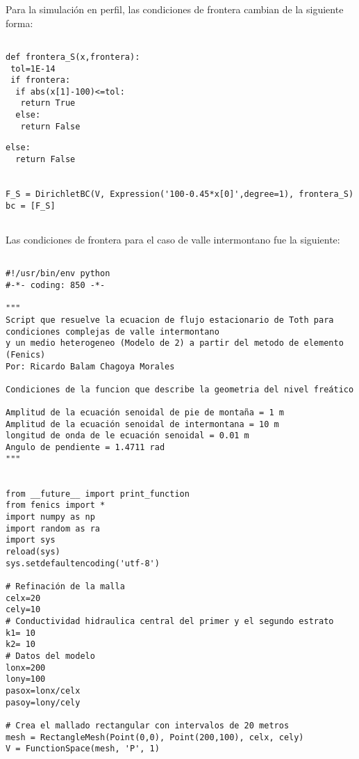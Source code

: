 Para la simulación en perfil, las condiciones de frontera cambian de la siguiente forma:

\lstset{language=python,breaklines=true, basicstyle=\footnotesize}
\begin{lstlisting}[frame=single]

def frontera_S(x,frontera):
 tol=1E-14    
 if frontera:
  if abs(x[1]-100)<=tol: 
   return True
  else:
   return False

\end{lstlisting}   
\begin{lstlisting}[frame=single]   
 else:
  return False  


F_S = DirichletBC(V, Expression('100-0.45*x[0]',degree=1), frontera_S)
bc = [F_S]


\end{lstlisting}

Las condiciones de frontera para el caso de valle intermontano fue la siguiente:

\lstset{language=python,breaklines=true, basicstyle=\footnotesize}
\begin{lstlisting}[frame=single]

#!/usr/bin/env python
#-*- coding: 850 -*-

"""
Script que resuelve la ecuacion de flujo estacionario de Toth para condiciones complejas de valle intermontano
y un medio heterogeneo (Modelo de 2) a partir del metodo de elemento (Fenics)
Por: Ricardo Balam Chagoya Morales

Condiciones de la funcion que describe la geometria del nivel freático

Amplitud de la ecuación senoidal de pie de montaña = 1 m
Amplitud de la ecuación senoidal de intermontana = 10 m
longitud de onda de le ecuación senoidal = 0.01 m
Angulo de pendiente = 1.4711 rad 
"""


from __future__ import print_function
from fenics import *
import numpy as np
import random as ra
import sys
reload(sys)
sys.setdefaultencoding('utf-8')

# Refinación de la malla  
celx=20
cely=10
# Conductividad hidraulica central del primer y el segundo estrato
k1= 10
k2= 10
# Datos del modelo
lonx=200
lony=100
pasox=lonx/celx
pasoy=lony/cely

# Crea el mallado rectangular con intervalos de 20 metros
mesh = RectangleMesh(Point(0,0), Point(200,100), celx, cely)
V = FunctionSpace(mesh, 'P', 1)

\end{lstlisting}
\newpage

